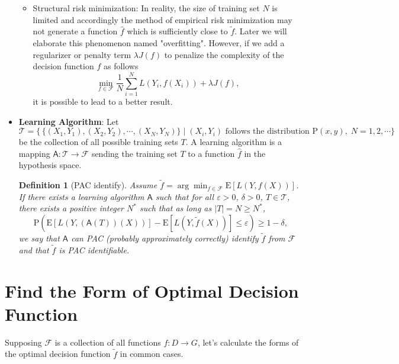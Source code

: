 \documentclass{report}
\newtheorem{definition}{Definition}[chapter]
\theoremstyle{nonumberplain}
\newcommand{\0}{\mathbf{0}}
\begin{document}
\begin{itemize}
\begin{itemize}
		\item Structural risk minimization: In reality, the size of training set $N$ is limited and accordingly the method of empirical risk minimization may not generate a function $\hat{f}$ which is sufficiently close to $\tilde{f}$. Later we will elaborate this phenomenon named "overfitting". However, if we add a regularizer or penalty term $\lambda J(f)$ to penalize the complexity of the decision function $f$ as follows
		\[
		\min_{f\in\mathcal{F}}\frac{1}{N}\sum_{i=1}^{N}L(Y_i,f(X_i))+\lambda J(f),
		\]
		it is possible to lead to a better result.
	\end{itemize} 
	\item \textbf{Learning Algorithm}: Let $$\mathscr{T}=\{\,\{(X_1,Y_1),(X_2,Y_2),\cdots,(X_{N},Y_{N})\}\;|\;(X_i,Y_i) \text{ follows the distribution }\mathrm{P}(x,y),\;N=1,2,\cdots \}$$ 
	be the collection of all possible training sets $T$. A learning algorithm is a mapping $\mathsf{A}:\mathscr{T}\to\mathcal{F}$ sending the training set $T$ to a function $\hat{f}$ in the hypothesis space. 
	

	\begin{definition}[PAC identify]
		Assume $\tilde{f}=\arg\min_{f\in\mathcal{F}}\mathrm{E}[L(Y,f(X))]
		$. If there exists a learning algorithm $\mathsf{A}$ such that for all $\varepsilon>0$, $\delta>0$, $T\in \mathcal{T}$, there exists a positive integer $N^*$ such that as long as $|T|=N\ge N^*$,
		\[
		\mathrm{P}\left(\mathrm{E}[L(Y,(\mathsf{A}(T))(X))]-\mathrm{E}[L(Y,\tilde{f}(X))] \le \varepsilon\right) \ge 1-\delta,
		\]
		we say that $\mathsf{A}$ can PAC (probably approximately correctly) identify $\tilde{f}$ from $\mathcal{F}$ and that $\tilde{f}$ is PAC identifiable.
	\end{definition}
\end{itemize} 




		
	
\section{Find the Form of Optimal Decision Function }
Supposing $\mathcal{F}$ is a collection of all functions $f:D\to G$, let's calculate the forms of the optimal decision function $\tilde{f}$ in common cases.
\end{document}
